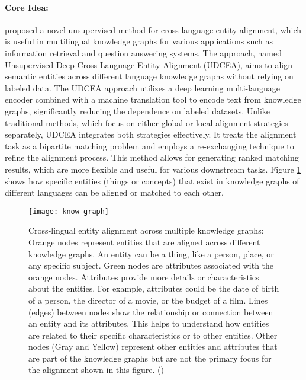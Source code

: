\paragraph{Core Idea:} \citet{jiang2023unsupervised} proposed a novel unsupervised method for cross-language entity alignment, which is useful in multilingual knowledge graphs for various applications such as information retrieval and question answering systems. The approach, named Unsupervised Deep Cross-Language Entity Alignment (UDCEA), aims to align semantic entities across different language knowledge graphs without relying on labeled data. The UDCEA approach utilizes a deep learning multi-language encoder combined with a machine translation tool to encode text from knowledge graphs, significantly reducing the dependence on labeled datasets. Unlike traditional methods, which focus on either global or local alignment strategies separately, UDCEA integrates both strategies effectively. It treats the alignment task as a bipartite matching problem and employs a re-exchanging technique to refine the alignment process. This method allows for generating ranked matching results, which are more flexible and useful for various downstream tasks. Figure \ref{fig: know-graph} shows how specific entities (things or concepts) that exist in knowledge graphs of different languages can be aligned or matched to each other.

\begin{figure}[tbh]
	\centering
	\texttt{[image: know-graph]}
	\caption[Cross-lingual entity alignment across multiple knowledge graphs]{Cross-lingual entity alignment across multiple knowledge graphs: Orange nodes represent entities that are aligned across different knowledge graphs. An entity can be a thing, like a person, place, or any specific subject. Green nodes are attributes associated with the orange nodes. Attributes provide more details or characteristics about the entities. For example, attributes could be the date of birth of a person, the director of a movie, or the budget of a film. Lines (edges) between nodes show the relationship or connection between an entity and its attributes. This helps to understand how entities are related to their specific characteristics or to other entities. Other nodes (Gray and Yellow) represent other entities and attributes that are part of the knowledge graphs but are not the primary focus for the alignment shown in this figure. (\citet{jiang2023unsupervised})}
	\label{fig: know-graph}
\end{figure}

